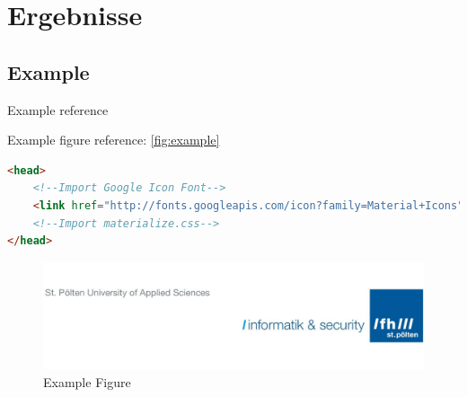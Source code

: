 \section{Ergebnisse}
\subsection{Example}

\lipsum[1]
\lipsum[1]
Example reference~\cite{example}

Example figure reference: \autoref{fig:example}

\begin{lstlisting}[caption={Example Listing},label={lst:example},language=html]
<head>
    <!--Import Google Icon Font-->
    <link href="http://fonts.googleapis.com/icon?family=Material+Icons" rel="stylesheet">
    <!--Import materialize.css-->
</head>
\end{lstlisting}

\begin{figure}[h]
    \includegraphics[width=\linewidth]{img/fhstp_logo.png}
    \caption{Example Figure}
    \label{fig:example}
\end{figure}
